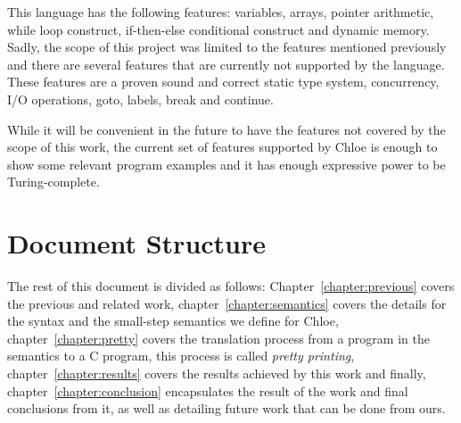 This language has the following features: variables, arrays, pointer arithmetic, while loop construct, if-then-else conditional construct and dynamic memory.
Sadly, the scope of this project was limited to the features mentioned previously and there are several features that are currently not supported by the language.
These features are a proven sound and correct static type system, concurrency, I/O operations, goto, labels, break and continue.

While it will be convenient in the future to have the features not covered by the scope of this work, the current set of features supported by Chloe is enough to show some relevant program examples and it has enough expressive power to be Turing-complete.


\section{Document Structure}\label{section:document_structure}

The rest of this document is divided as follows: Chapter~\ref{chapter:previous} covers the previous and related work, chapter~\ref{chapter:semantics} covers the details for the syntax and the small-step semantics we define for Chloe, chapter~\ref{chapter:pretty} covers the translation process from a program in the semantics to a C program, this process is called \textit{pretty printing}, chapter~\ref{chapter:results} covers the results achieved by this work and finally, chapter~\ref{chapter:conclusion} encapsulates the result of the work and final conclusions from it, as well as detailing future work that can be done from ours.